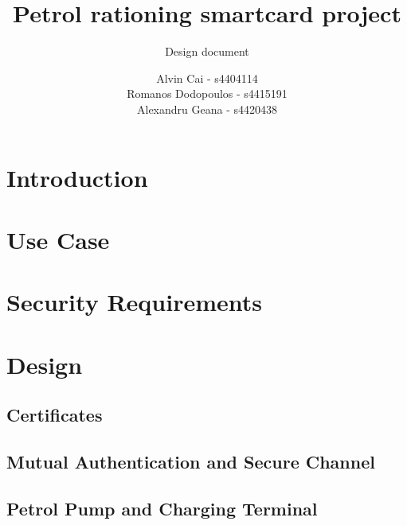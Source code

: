 \documentclass[a4paper,10pt]{llncs}
\title{Petrol rationing smartcard project}
\subtitle{Design document}
\author{Alvin Cai - s4404114 \\ Romanos Dodopoulos - s4415191 \\ Alexandru Geana - s4420438}
\institute{}
\begin{document}
\maketitle

\section{Introduction}


\section{Use Case}



\section{Security Requirements}



\section{Design}
\subsection{Certificates}

\subsection{Mutual Authentication and Secure Channel}

\subsection{Petrol Pump and Charging Terminal}
\end{document}
